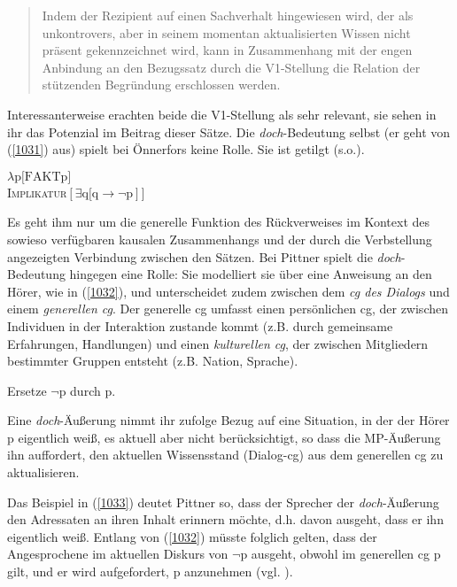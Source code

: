 {\begin{quotation}
Indem der Rezipient auf einen Sachverhalt hingewiesen wird, der als unkontrovers, aber in seinem momentan aktualisierten Wissen nicht präsent gekennzeichnet wird, kann in Zusammenhang mit der engen Anbindung an den Bezugssatz durch die V1-Stellung die Relation der stützenden Begründung erschlossen werden.
\hfill\hbox {\citet[170]{Pittner2011}}
\end{quotation}
Interessanterweise erachten beide die V1-Stellung als sehr relevant, sie sehen in ihr das Potenzial im Beitrag dieser Sätze. Die \textit{doch}-Bedeutung selbst (er geht von (\ref{1031}) aus) spielt bei Önnerfors keine Rolle. Sie ist getilgt (s.o.).

\begin{exe}
	\ex\label{1031} 
		$\lambda \textrm{p[FAKTp}]$\\
		\textsc{Implikatur}$[\exists \textrm{q[q} \rightarrow \neg \textrm{p}]]$
		\hfill\hbox {\citet[83]{Ormelius-Sandblom1997}}
\end{exe}
Es geht ihm nur um die generelle Funktion des Rückverweises im Kontext des sowieso verfügbaren kausalen Zusammenhangs und der durch die Verbstellung angezeigten Verbindung zwischen den Sätzen. Bei Pittner spielt die \textit{doch}-Bedeu\-tung hingegen eine Rolle: Sie modelliert sie über eine Anweisung an den Hörer, wie in (\ref{1032}), und unterscheidet zudem zwischen dem \textit{cg des Dialogs}  und einem  \textit{generellen cg}. Der generelle cg umfasst einen  persönlichen cg, der zwischen Individuen in der Interaktion zustande kommt (z.B. durch gemeinsame Erfahrungen, Handlungen) und  einen \textit{kulturellen cg}, der zwischen Mitgliedern bestimmter Gruppen entsteht (z.B. Nation, Sprache).

\begin{exe}
	\ex\label{1032} 
	Ersetze $\neg$p durch p.	
	\hfill\hbox {\citet[167]{Pittner2011}}
\end{exe}
Eine \textit{doch}-Äußerung nimmt ihr zufolge Bezug auf eine Situation, in der der Hörer p eigentlich weiß, es aktuell aber nicht berücksichtigt, so dass die MP-Äußerung ihn auffordert, den aktuellen Wissensstand (Dialog-cg) aus dem generellen cg zu aktualisieren. 

Das Beispiel in (\ref{1033}) deutet Pittner so, dass der Sprecher der \textit{doch}-Äußerung den Adressaten an ihren Inhalt erinnern möchte, d.h. davon ausgeht, dass er ihn eigentlich weiß. Entlang von (\ref{1032}) müsste folglich gelten, dass der Angespro\-chene im aktuellen Diskurs von $\neg$p ausgeht, obwohl im generellen cg p gilt, und er wird aufgefordert, p anzunehmen (vgl. \citealt[167-168]{Pittner2011}).

}
